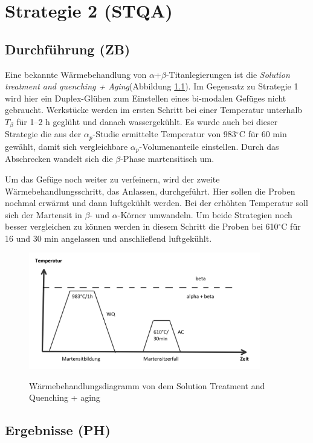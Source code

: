 \chapter{Strategie 2 (STQA)}

\section{Durchführung (ZB)}

Eine bekannte Wärmebehandlung von $\alpha$+$\beta$-Titanlegierungen ist die  \textit{Solution treatment and quenching + Aging}(Abbildung \ref{fig:SQ}). Im Gegensatz zu  Strategie 1 wird hier ein Duplex-Glühen zum Einstellen eines bi-modalen Gefüges nicht gebraucht. Werkstücke werden im ersten Schritt bei einer Temperatur unterhalb $T_{\beta}$ für 1--2 h geglüht und danach wassergekühlt. Es wurde auch bei dieser Strategie die aus der $\alpha_p$-Studie ermittelte Temperatur von 983$^\circ$C für 60 min gewählt, damit sich vergleichbare $\alpha_p$-Volumenanteile einstellen. Durch das Abschrecken wandelt sich die $\beta$-Phase martensitisch um.

Um das Gefüge noch weiter zu verfeinern, wird der zweite Wärmebehandlungsschritt, das Anlassen, durchgeführt. Hier sollen die Proben nochmal erwärmt und dann luftgekühlt werden. Bei der erhöhten Temperatur soll sich der Martensit in $\beta$- und $\alpha$-Körner umwandeln.
Um beide Strategien noch besser vergleichen zu können werden in diesem Schritt die Proben bei  610$^\circ$C für 16 und 30 min angelassen und anschließend luftgekühlt.

\begin{figure}[h]
	\centering
	{\includegraphics[width=0.9\textwidth]{./Bilder/SQ.png}}
	\caption{Wärmebehandlungsdiagramm von dem Solution Treatment and Quenching + aging}
	\label{fig:SQ}
\end{figure}

\section{Ergebnisse (PH)}

